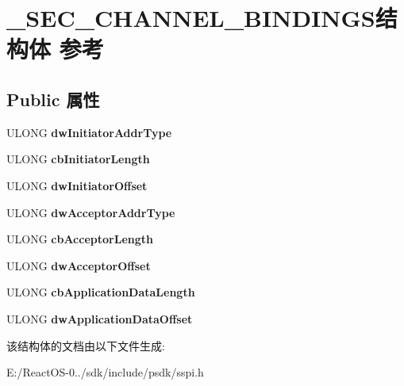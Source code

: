 \hypertarget{struct___s_e_c___c_h_a_n_n_e_l___b_i_n_d_i_n_g_s}{}\section{\+\_\+\+S\+E\+C\+\_\+\+C\+H\+A\+N\+N\+E\+L\+\_\+\+B\+I\+N\+D\+I\+N\+G\+S结构体 参考}
\label{struct___s_e_c___c_h_a_n_n_e_l___b_i_n_d_i_n_g_s}
\subsection*{Public 属性}
\begin{DoxyCompactItemize}
\item 
\mbox{\label{struct___s_e_c___c_h_a_n_n_e_l___b_i_n_d_i_n_g_s_a593b9540bb68adbe4ad41b756e1af6b5}} 
U\+L\+O\+NG {\bfseries dw\+Initiator\+Addr\+Type}
\item 
\mbox{\label{struct___s_e_c___c_h_a_n_n_e_l___b_i_n_d_i_n_g_s_ab76580d034ff111dc8e965e6b7465bb7}} 
U\+L\+O\+NG {\bfseries cb\+Initiator\+Length}
\item 
\mbox{\label{struct___s_e_c___c_h_a_n_n_e_l___b_i_n_d_i_n_g_s_ac3adffffeee2351841b195fab6008202}} 
U\+L\+O\+NG {\bfseries dw\+Initiator\+Offset}
\item 
\mbox{\label{struct___s_e_c___c_h_a_n_n_e_l___b_i_n_d_i_n_g_s_adfa9fe9fbf8aa1092e2cc7e4127bebcc}} 
U\+L\+O\+NG {\bfseries dw\+Acceptor\+Addr\+Type}
\item 
\mbox{\label{struct___s_e_c___c_h_a_n_n_e_l___b_i_n_d_i_n_g_s_a7f07b059d5ef1518a9e0dab6fae78009}} 
U\+L\+O\+NG {\bfseries cb\+Acceptor\+Length}
\item 
\mbox{\label{struct___s_e_c___c_h_a_n_n_e_l___b_i_n_d_i_n_g_s_aea625c3b7e9ae0f49c791fe223ed4030}} 
U\+L\+O\+NG {\bfseries dw\+Acceptor\+Offset}
\item 
\mbox{\label{struct___s_e_c___c_h_a_n_n_e_l___b_i_n_d_i_n_g_s_ac529e83ac66cd4b852500fd07c26c1a0}} 
U\+L\+O\+NG {\bfseries cb\+Application\+Data\+Length}
\item 
\mbox{\label{struct___s_e_c___c_h_a_n_n_e_l___b_i_n_d_i_n_g_s_a8d41d21931d843b347d11efbf24f1e3f}} 
U\+L\+O\+NG {\bfseries dw\+Application\+Data\+Offset}
\end{DoxyCompactItemize}


该结构体的文档由以下文件生成\+:\begin{DoxyCompactItemize}
\item 
E\+:/\+React\+O\+S-\/0../sdk/include/psdk/sspi.\+h\end{DoxyCompactItemize}
